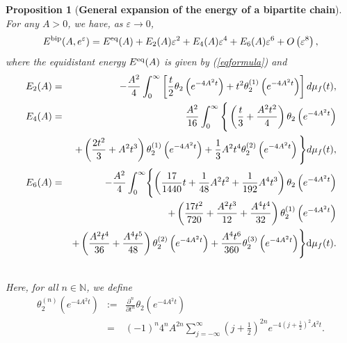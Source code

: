 \documentclass[12pt]{iopart}
\newtheorem{prop}[thm]{Proposition}
\theoremstyle{definition}
\newcommand{\N}{\mathbb N}
\begin{document}
\begin{prop}[\textbf{General expansion of the energy of a bipartite chain}]\label{prop:expansion}
For any $A>0$, we have, as $\varepsilon\to 0$, 
\begin{equation} \label{Landau2}
E^{\rm bip}(A,e^{\varepsilon}) = E^{\rm eq}(A) + E_2(A) \varepsilon^2
+ E_4(A) \varepsilon^4 + E_6(A) \varepsilon^6 + O\left( \varepsilon^8 \right) ,
\end{equation}
where the equidistant energy $E^{\rm eq}(A)$ is given by {\rm (\ref{eqformula})}
and  
\begin{eqnarray}
E_2(A) & = & - \frac{A^2}{4} \int_0^{\infty} \left[
\frac{t}{2} \theta_2\left( e^{-4 A^2 t} \right)
+ t^2 \theta_2^{(1)}\left( e^{-4 A^2 t} \right) \right] d\mu_f(t) , \nonumber\\
E_4(A) & = & \frac{A^2}{16} \int_0^{\infty} \Bigg\{
\left( \frac{t}{3} + \frac{A^2 t^2}{4} \right) \theta_2\left( e^{-4 A^2 t} \right)
\nonumber \\ & &
+ \left( \frac{2 t^2}{3} + A^2 t^3 \right) \theta_2^{(1)}\left( e^{-4 A^2 t} \right)
+ \frac{1}{3} A^2 t^4 \theta_2^{(2)}\left( e^{-4 A^2 t} \right)
\Bigg\} d\mu_f(t) , \nonumber \\
E_6(A) & = & -\frac{A^2}{4} \int_0^\infty \Biggl\{\left(\frac{17}{1440}t
+\frac{1}{48}A^2t^2 +\frac{1}{192}A^4t^3\right)\theta_2\left(e^{-4A^2t}\right)
\nonumber\\ & & + \left(\frac{17t^2}{720}+\frac{A^2t^3}{12}
+\frac{A^4t^4}{32}\right)\theta_2^{(1)}\left(e^{-4A^2t}\right) \nonumber\\
& & + \left(\frac{A^2t^4}{36} + \frac{A^4t^5}{48}\right)
\theta_2^{(2)}\left(e^{-4A^2t}\right) +\frac{A^4t^6}{360}
\theta_2^{(3)}\left(e^{-4A^2t}\right) \Biggr\} {\rm d}\mu_f(t) . \nonumber \\ & &
\end{eqnarray}
Here, for all $ n\in \N$, we define
\begin{eqnarray}
\theta_2^{(n)}\left( e^{-4 A^2t}\right) & := &
\frac{\partial^n}{\partial t^n} \theta_2\left( e^{-4 A^2 t} \right) \nonumber \\
& = & (-1)^n 4^n A^{2n} \sum_{j=-\infty}^{\infty}
\left( j+\frac{1}{2} \right)^{2n} e^{-4\left(j+\scriptstyle\frac{1}{2}\right)^2A^2 t} . \label{dertheta2}
\end{eqnarray}
\end{prop}
\end{document}
